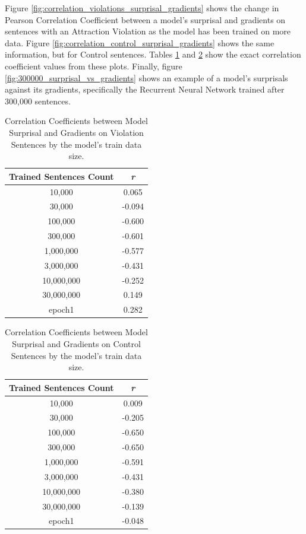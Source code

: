 \documentclass{IEEEtran}
\begin{document}
Figure \ref{fig:correlation_violations_surprisal_gradients} shows the change in Pearson Correlation Coefficient between a model's surprisal and gradients on sentences with an Attraction Violation as the model has been trained on more data.
Figure \ref{fig:correlation_control_surprisal_gradients} shows the same information, but for Control sentences.
Tables \ref{tab:correlation_violations_surprisal_gradients} and \ref{tab:correlation_control_surprisal_gradients} show the exact correlation coefficient values from these plots.
Finally, figure \ref{fig:300000_surprisal_vs_gradients} shows an example of a model's surprisals against its gradients, specifically the Recurrent Neural Network trained after 300,000 sentences.

\begin{table}
    \centering
    \begin{tabular}{c|c}
        \textbf{Trained Sentences Count} & \textbf{\textit{r}} \\
        \hline
        10,000&0.065\\
        30,000&-0.094\\
        100,000&-0.600\\
        300,000&-0.601\\
        1,000,000&-0.577\\
        3,000,000&-0.431\\
        10,000,000&-0.252\\
        30,000,000&0.149\\
        epoch1&0.282
    \end{tabular}
    \caption{Correlation Coefficients between Model Surprisal and Gradients on Violation Sentences by the model's train data size.}
    \label{tab:correlation_violations_surprisal_gradients}
\end{table}
\begin{table}
    \centering
    \begin{tabular}{c|c}
        \textbf{Trained Sentences Count} & \textbf{\textit{r}} \\
        \hline
        10,000&0.009\\
        30,000&-0.205\\
        100,000&-0.650\\
        300,000&-0.650\\
        1,000,000&-0.591\\
        3,000,000&-0.431\\
        10,000,000&-0.380\\
        30,000,000&-0.139\\
        epoch1&-0.048
    \end{tabular}
    \caption{Correlation Coefficients between Model Surprisal and Gradients on Control Sentences by the model's train data size.}
    \label{tab:correlation_control_surprisal_gradients}
\end{table}
\end{document}
